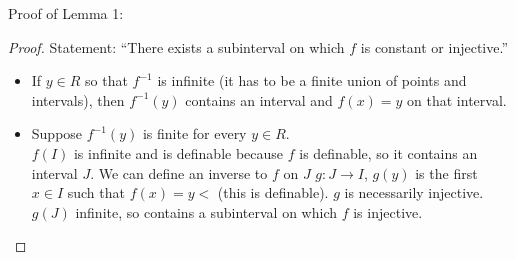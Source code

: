 Proof of Lemma 1:
\begin{proof}
    Statement: ``There exists a subinterval on which $f$ is constant or injective.''

    \begin{itemize}
        \item If $y\in R$ so that $f^{-1}$ is infinite (it has to be a finite union of points and intervals), 
        then $f^{-1}(y)$ contains an interval and $f(x)=y$ on that interval.
        \item Suppose $f^{-1}(y)$ is finite for every $y\in R$.\\
        $f(I)$ is infinite and is definable because $f$ is definable, so it contains an interval $J$.
        We can define an inverse to $f$ on $J$ $g:J\to I$, $g(y)$ is the first $x\in I$ such that $f(x)=y<$ (this is definable). $g$ is necessarily injective. $g(J)$ infinite, so contains a subinterval on which $f$ is injective.
    \end{itemize}
\end{proof}

